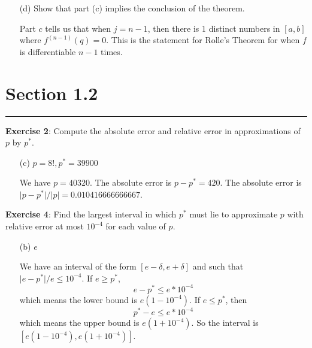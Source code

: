 \documentclass{article}
\begin{document}
\begin{itemize}
        \item [(d)] Show that part (c) implies the conclusion of the theorem.
            \begin{answer}
                Part $c$ tells us that when $j = n - 1$, then there is $1$ distinct numbers in $[a, b]$ where $f^{(n - 1)}(q) = 0$. This is the statement for Rolle's Theorem for when $f$ is differentiable $n - 1$ times.
            \end{answer}
    \end{itemize}

\newpage
\section*{Section 1.2}
\hrule

\textbf{Exercise 2}:
    Compute the absolute error and relative error in approximations of $p$ by $p^{*}$.
        \begin{itemize}
            \item [(c)] $p = 8!, p^{*} = 39900$ 
                \begin{answer}
                    We have $p = 40320$. The absolute error is $p - p^{*} = 420$. The absolute error is $\lvert p - p^{*} \rvert / \lvert p \rvert = 0.010416666666667$.
                \end{answer}
        \end{itemize}

\textbf{Exercise 4}:
    Find the largest interval in which $p^{*}$ must lie to approximate $p$ with relative error at most $10^{-4}$ for each value of $p$.
        \begin{itemize}
            \item [(b)] $e$
                \begin{answer}
                    We have an interval of the form $[e - \delta, e + \delta]$ and such that $\lvert e - p^{*} \rvert / e \leq 10^{-4}$. If $e \geq p^{*}$,
                        \begin{equation*}
                            e - p^{*} \leq e * 10^{-4}
                        \end{equation*}
                    which means the lower bound is $e(1 - 10^{-4})$. If $e \leq p^{*}$, then 
                        \begin{equation*}
                            p^{*} - e \leq e * 10^{-4}
                        \end{equation*}
                    which means the upper bound is $e(1 + 10^{-4})$. So the interval is $[e(1 - 10^{-4}), e(1 + 10^{-4})]$. 
                \end{answer}
        \end{itemize}
\end{document}
